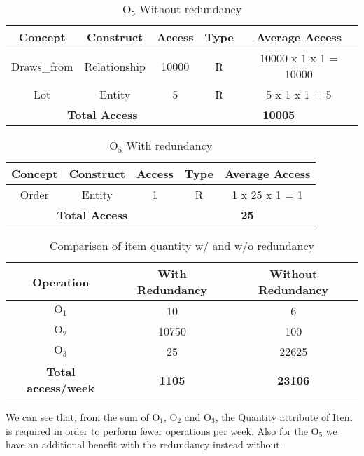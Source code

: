 \begin{table}[!h]\caption{	$ \textrm{O}_\textrm{5} $ Without redundancy }
	\begin{center}
		\begin{tabular}{| c | c | c | c | c |}
			\hline
			\textbf{Concept} & \textbf{Construct} & \textbf{Access} & \textbf{Type} & \textbf{Average Access} \\ \hline
			Draws\_from & Relationship & 10000 & R & 10000 x 1 x 1 = 10000 \\ \hline
			Lot & Entity &  5 & R & 5 x 1 x 1 = 5 \\ \hline
			\multicolumn{3}{|c|}{\textbf{Total Access}} & \multicolumn{2}{|c|}{\textbf{10005}} \\ \hline
		\end{tabular}
	\end{center}
\end{table}
\begin{table}[!h]\caption{	$ \textrm{O}_\textrm{5} $ With redundancy }
	\begin{center}
		\begin{tabular}{| c | c | c | c | c |}
			\hline
			\textbf{Concept} & \textbf{Construct} & \textbf{Access} & \textbf{Type} & \textbf{Average Access} \\ \hline
			Order & Entity & 1 & R & 1 x 25 x 1 = 1 \\ \hline
			\multicolumn{3}{|c|}{\textbf{Total Access}} & \multicolumn{2}{|c|}{\textbf{25}} \\ \hline
		\end{tabular}
	\end{center}
\end{table}
\begin{table}[!h]\caption{ Comparison of item quantity w/ and w/o redundancy }
	\begin{center}
		\begin{tabular}{ | c | c | c | }
			\hline
			\textbf{Operation} & \textbf{With Redundancy} & \textbf{Without Redundancy} \\ \hline
			$ \textrm{O}_\textrm{1} $ & 10 & 6\\ \hline
			$ \textrm{O}_\textrm{2} $ & 10750 & 100 \\ \hline
			$ \textrm{O}_\textrm{3} $ & 25 & 22625 \\\hline
			\textbf{Total access/week } & 	\textbf{1105} &	\textbf{23106} \\\hline
		\end{tabular}
	\end{center}
\end{table}

We can see that, from the sum of $ \textrm{O}_\textrm{1}$, $ \textrm{O}_\textrm{2}$ and $ \textrm{O}_\textrm{3}$, the Quantity attribute of Item is required in order to perform fewer operations per week. Also for the $ \textrm{O}_\textrm{5}$ we have an additional benefit with the redundancy instead without.